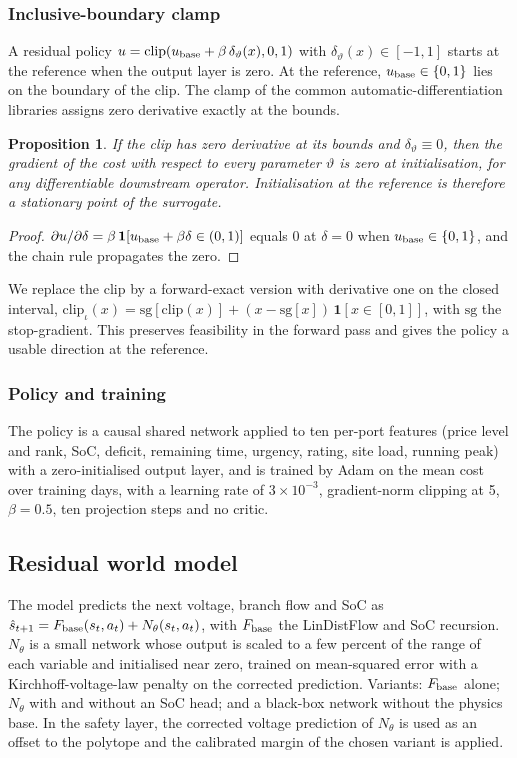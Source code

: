 \documentclass[11pt]{article}
\newtheorem{prop}{Proposition}
\begin{document}
\subsubsection{Inclusive-boundary clamp}
A residual policy $u=\mathrm{clip}(u_{\rm base}+\beta\,\delta_\vartheta(x),0,1)$ with $\delta_\vartheta(x)\in[-1,1]$ starts at the reference when the output layer is zero. At the reference, $u_{\rm base}\in\{0,1\}$ lies on the boundary of the clip. The clamp of the common automatic-differentiation libraries assigns zero derivative exactly at the bounds.
\begin{prop}\label{prop:clip}
If the clip has zero derivative at its bounds and $\delta_\vartheta\equiv0$, then the gradient of the cost with respect to every parameter $\vartheta$ is zero at initialisation, for any differentiable downstream operator. Initialisation at the reference is therefore a stationary point of the surrogate.
\end{prop}
\begin{proof}
$\partial u/\partial\delta=\beta\,\mathbf 1[u_{\rm base}+\beta\delta\in(0,1)]$ equals $0$ at $\delta=0$ when $u_{\rm base}\in\{0,1\}$, and the chain rule propagates the zero.
\end{proof}
We replace the clip by a forward-exact version with derivative one on the closed interval,
$\mathrm{clip}_\iota(x)=\mathrm{sg}[\mathrm{clip}(x)]+(x-\mathrm{sg}[x])\,\mathbf 1[x\in[0,1]]$, with $\mathrm{sg}$ the stop-gradient. This preserves feasibility in the forward pass and gives the policy a usable direction at the reference.

\subsubsection{Policy and training}
The policy is a causal shared network applied to ten per-port features (price level and rank, SoC, deficit, remaining time, urgency, rating, site load, running peak) with a zero-initialised output layer, and is trained by Adam on the mean cost over training days, with a learning rate of $3\times10^{-3}$, gradient-norm clipping at 5, $\beta=0.5$, ten projection steps and no critic.

\subsection{Residual world model}
The model predicts the next voltage, branch flow and SoC as $\hat s_{t+1}=F_{\rm base}(s_t,a_t)+N_\theta(s_t,a_t)$, with $F_{\rm base}$ the LinDistFlow and SoC recursion. $N_\theta$ is a small network whose output is scaled to a few percent of the range of each variable and initialised near zero, trained on mean-squared error with a Kirchhoff-voltage-law penalty on the corrected prediction. Variants: $F_{\rm base}$ alone; $N_\theta$ with and without an SoC head; and a black-box network without the physics base. In the safety layer, the corrected voltage prediction of $N_\theta$ is used as an offset to the polytope and the calibrated margin of the chosen variant is applied.
\end{document}
